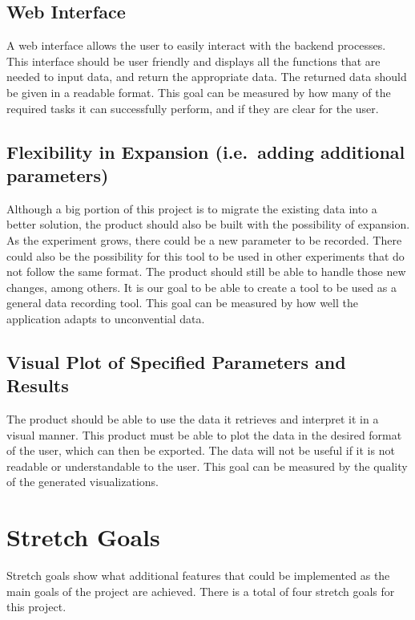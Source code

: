 \documentclass{article}
\begin{document}
\subsection*{Web Interface}
A web interface allows the user to easily interact with the backend processes.
This interface should be user friendly and displays all the functions that are
needed to input data, and return the appropriate data. The returned data should
be given in a readable format. This goal can be measured by how many of the
required tasks it can successfully perform, and if they are clear for the user.

\subsection*{Flexibility in Expansion (i.e.\ adding additional parameters)}
Although a big portion of this project is to migrate the existing data into a
better solution, the product should also be built with the possibility of
expansion. As the experiment grows, there could be a new parameter to be
recorded. There could also be the possibility for this tool to be used in other
experiments that do not follow the same format. The product should still be able
to handle those new changes, among others. It is our goal to be able to create a
tool to be used as a general data recording tool. This goal can be measured by
how well the application adapts to unconvential data.

\subsection*{Visual Plot of Specified Parameters and Results}
The product should be able to use the data it retrieves and interpret it in a
visual manner. This product must be able to plot the data in the desired format
of the user, which can then be exported. The data will not be useful if it is
not readable or understandable to the user. This goal can be measured by the
quality of the generated visualizations.

\section{Stretch Goals}
Stretch goals show what additional features that could be implemented as the main
goals of the project are achieved. There is a total of four stretch goals for this project.
\end{document}

